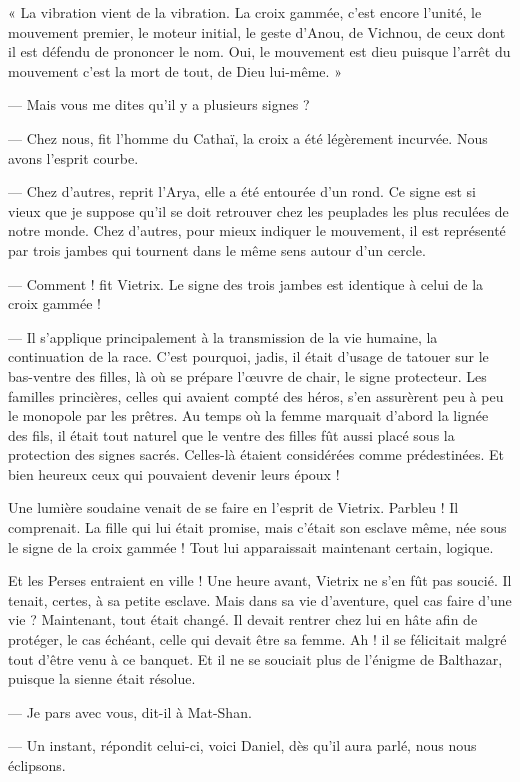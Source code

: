 \documentclass[a4paper, 11pt, oneside, polutonikogreek, french]{article}
\begin{document}
« La vibration vient de la vibration. La croix gammée, c'est encore l'unité, le mouvement premier, le moteur initial, le geste d'Anou, de Vichnou, de ceux dont il est défendu de prononcer le nom. Oui, le mouvement est dieu puisque l'arrêt du mouvement c'est la mort de tout, de Dieu lui-même. »

--- Mais vous me dites qu'il y a plusieurs signes ?

--- Chez nous, fit l'homme du Cathaï, la croix a été légèrement incurvée. Nous avons l'esprit courbe.

--- Chez d'autres, reprit l'Arya, elle a été entourée d'un rond. Ce signe est si vieux que je suppose qu'il se doit retrouver chez les peuplades les plus reculées de notre monde. Chez d'autres, pour mieux indiquer le mouvement, il est représenté par trois jambes qui tournent dans le même sens autour d'un cercle.

--- Comment ! fit Vietrix. Le signe des trois jambes est identique à celui de la croix gammée !

--- Il s'applique principalement à la transmission de la vie humaine, la continuation de la race. C'est pourquoi, jadis, il était d'usage de tatouer sur le bas-ventre des filles, là où se prépare l'œuvre de chair, le signe protecteur. Les familles princières, celles qui avaient compté des héros, s'en assurèrent peu à peu le monopole par les prêtres. Au temps où la femme marquait d'abord la lignée des fils, il était tout naturel que le ventre des filles fût aussi placé sous la protection des signes sacrés. Celles-là étaient considérées comme prédestinées. Et bien heureux ceux qui pouvaient devenir leurs époux !

Une lumière soudaine venait de se faire en l'esprit de Vietrix. Parbleu ! Il comprenait. La fille qui lui était promise, mais c'était son esclave même, née sous le signe de la croix gammée ! Tout lui apparaissait maintenant certain, logique.

Et les Perses entraient en ville ! Une heure avant, Vietrix ne s'en fût pas soucié. Il tenait, certes, à sa petite esclave. Mais dans sa vie d'aventure, quel cas faire d'une vie ? Maintenant, tout était changé. Il devait rentrer chez lui en hâte afin de protéger, le cas échéant, celle qui devait être sa femme. Ah ! il se félicitait malgré tout d'être venu à ce banquet. Et il ne se souciait plus de l'énigme de Balthazar, puisque la sienne était résolue.

--- Je pars avec vous, dit-il à Mat-Shan.

--- Un instant, répondit celui-ci, voici Daniel, dès qu'il aura parlé, nous nous éclipsons.
\end{document}
